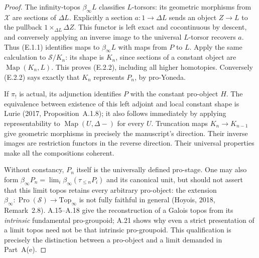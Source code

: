 \begin{proof}
The infinity-topos $\beta_\infty L$ classifies $L$-torsors: its geometric morphisms from $\mathcal X$ are sections of $\Delta L$. Explicitly a section $a:1\to\Delta L$ sends an object $Z\to L$ to the pullback $1\times_{\Delta L}\Delta Z$. This functor is left exact and cocontinuous by descent, and conversely applying an inverse image to the universal $L$-torsor recovers $a$. Thus (E.1.1) identifies maps to $\beta_\infty L$ with maps from $P$ to $L$. Apply the same calculation to $\mathcal S/K_n$: its shape is $K_n$, since sections of a constant object are $\operatorname{Map}(K_n,L)$. This proves (E.2.2), including all higher homotopies. Conversely (E.2.2) says exactly that $K_n$ represents $P_n$, by pro-Yoneda.

If $\pi_!$ is actual, its adjunction identifies $P$ with the constant pro-object $H$. The equivalence between existence of this left adjoint and local constant shape is Lurie (2017, Proposition~A.1.8); it also follows immediately by applying representability to $\operatorname{Map}(U,\Delta-)$ for every $U$. Truncation maps $K_n\to K_{n-1}$ give geometric morphisms in precisely the manuscript's direction. Their inverse images are restriction functors in the reverse direction. Their universal properties make all the compositions coherent.

Without constancy, $P_n$ itself is the universally defined pro-stage. One may also form $\beta_\infty P_n=\lim_i\beta_\infty(\tau_{\le n}P_i)$ and its canonical unit, but should not assert that this limit topos retains every arbitrary pro-object: the extension $\beta_\infty:\operatorname{Pro}(\mathcal S)\to\mathrm{Top}_\infty$ is not fully faithful in general (Hoyois, 2018, Remark~2.8). A.15--A.18 give the reconstruction of a Galois topos from its \emph{intrinsic} fundamental pro-groupoid; A.21 shows why even a strict presentation of a limit topos need not be that intrinsic pro-groupoid. This qualification is precisely the distinction between a pro-object and a limit demanded in Part~A(e). 
\end{proof}

